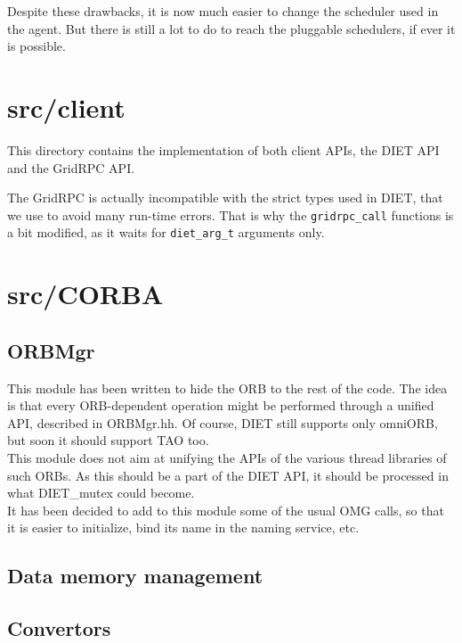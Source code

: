 Despite these drawbacks, it is now much easier to change the scheduler used in
the agent. But there is still a lot to do to reach the pluggable schedulers, if
ever it is possible.

\section{\textsf{src/client}}
\label{s:client}

This directory contains the implementation of both client APIs, the DIET API and
the GridRPC API.

The GridRPC is actually incompatible with the strict types
used in DIET, that we use to avoid many run-time errors. That is why the
\texttt{gridrpc\_call} functions is a bit modified, as it waits for
\texttt{diet\_arg\_t} arguments only.



\section{\textsf{src/CORBA}}
\label{s:CORBA}

\subsection{\textsf{ORBMgr}}

This module has been written to hide the ORB to the rest of the code. The idea
is that every ORB-dependent operation might be performed through a unified API,
described in \textsf{ORBMgr.hh}. Of course, DIET still supports only omniORB,
but soon it should support TAO too.
\\
This module does not aim at unifying the APIs of the various thread libraries of
such ORBs. As this should be a part of the DIET API, it should be processed in
what \textsf{DIET\_mutex} could become.
\\
It has been decided to add to this module some of the usual OMG calls, so that
it is easier to initialize, bind its name in the naming service, etc.


\subsection{Data memory management}



\subsection{Convertors}

